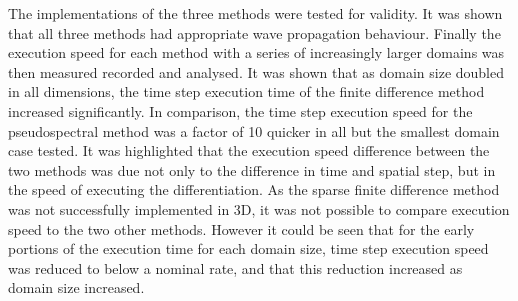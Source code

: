 The implementations of the three methods were tested for validity. It was shown that all three methods had appropriate wave propagation behaviour. Finally the execution speed for each method with a series of increasingly larger domains was then measured recorded and analysed. It was shown that as domain size doubled in all dimensions, the time step execution time of the finite difference method increased significantly. In comparison, the time step execution speed for the pseudospectral method was a factor of 10 quicker in all but the smallest domain case tested. It was highlighted that the execution speed difference between the two methods was due not only to the difference in time and spatial step, but in the speed of executing the differentiation. As the sparse finite difference method was not successfully implemented in 3D, it was not possible to compare execution speed to the two other methods. However it could be seen that for the early portions of the execution time for each domain size, time step execution speed was reduced to below a nominal rate, and that this reduction increased as domain size increased. \\

